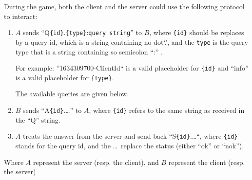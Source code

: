 \documentclass{article}
\begin{document}
During the game, both the client and the server could use the following
protocol to interact:
\begin{enumerate}
	\item \(A\) sends ``Q\texttt{\{id\}}.\texttt{\{type\}}:\texttt{query
	string}'' to \(B\), where \texttt{\{id\}} should be replaces by a query id,
	which is a string containing no dot`.', and the \texttt{type} is the query
	type that is a string containing so semicolon ``:'' .

	For example: ''1634309700-ClientId`` is a valid placeholder for
	\texttt{\{id\}} and ``info'' is a valid placeholder for \texttt{\{type\}}.

	The available queries are given below.

	\item \(B\) sends ``A\texttt{\{id\}}.\dots'' to \(A\), where \texttt{\{id\}}
	refers to the same string as received in the ``Q'' string.

	\item \(A\) treats the answer from the server and send back
	``S\texttt{\{id\}}.\dots``, where \texttt{\{id\}} stands for the query id,
	and the \dots~replace the status (either ``ok'' or ``nok'').
\end{enumerate}
Where \(A\) represent the server (resp. the client), and \(B\) represent the
client (resp. the server)
\end{document}

